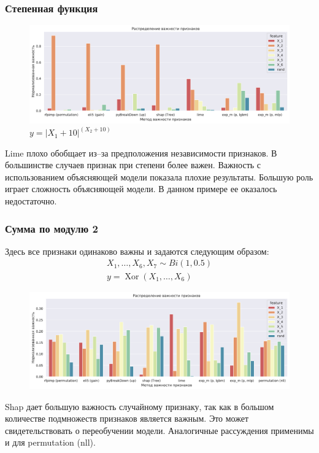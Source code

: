 \documentclass[12pt]{article}
\begin{document}
\subsubsection{Степенная функция}
\begin{figure}[h]
\centering
\includegraphics[width=\textwidth]{images/at2_setup5.pdf}
\caption{$y=\left|X_{1}+10\right|^{\left(X_{2}+10\right)}$}
\end{figure}

Lime плохо обобщает из--за предположения независимости признаков. В большинстве случаев признак при степени более важен. Важность с использованием объясняющей модели показала плохие результаты. Большую роль играет сложность объясняющей модели. В данном примере ее оказалось недостаточно.

\subsubsection{Сумма по модулю 2}
Здесь все признаки одинаково важны и задаются следующим образом:
\begin{gather*}
    X_{1}, \ldots, X_{6}, X_{7} \sim B i(1,0.5) \\
    y=\operatorname{Xor}\left(X_{1}, \ldots, X_{6}\right)
\end{gather*}
\begin{figure}[h]
\centering
\includegraphics[width=\textwidth]{images/at2_setup6.pdf}
\end{figure}

Shap дает большую важность случайному признаку, так как в большом количестве подмножеств признаков является важным. Это может свидетельствовать о переобучении модели. Аналогичные рассуждения применимы и для permutation (nll). 
\end{document}

